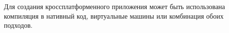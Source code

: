 Для создания кроссплатформенного приложения может быть использована компиляция в нативный код, виртуальные машины или комбинация обоих подходов. 

